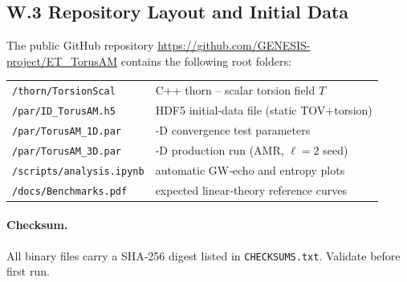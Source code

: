 \documentclass{article}
\begin{document}
\subsection{W.3  Repository Layout and Initial Data}
The public GitHub repository  
\url{https://github.com/GENESIS-project/ET_TorusAM}  
contains the following root folders:

\begin{center}
\begin{tabular}{@{}ll@{}}
\texttt{/thorn/TorsionScal} & \;C++ thorn – scalar torsion field $T$\\
\texttt{/par/ID\_TorusAM.h5} & \;HDF5 initial‑data file (static TOV+torsion)\\
\texttt{/par/TorusAM\_1D.par} & \;1‑D convergence test parameters\\
\texttt{/par/TorusAM\_3D.par} & \;3‑D production run (AMR, $\ell=2$ seed)\\
\texttt{/scripts/analysis.ipynb} & \;automatic GW‑echo and entropy plots\\
\texttt{/docs/Benchmarks.pdf} & \;expected linear‑theory reference curves
\end{tabular}
\end{center}

\paragraph{Checksum.}
All binary files carry a SHA‑256 digest listed in \texttt{CHECKSUMS.txt}.  
Validate before first run.

\end{document}

